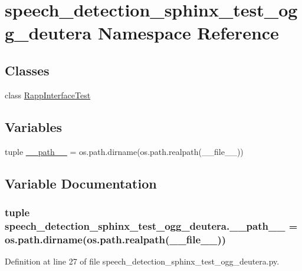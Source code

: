 \hypertarget{namespacespeech__detection__sphinx__test__ogg__deutera}{\section{speech\-\_\-detection\-\_\-sphinx\-\_\-test\-\_\-ogg\-\_\-deutera Namespace Reference}
\label{namespacespeech__detection__sphinx__test__ogg__deutera}
}
\subsection*{Classes}
\begin{DoxyCompactItemize}
\item 
class \hyperlink{classspeech__detection__sphinx__test__ogg__deutera_1_1RappInterfaceTest}{Rapp\-Interface\-Test}
\end{DoxyCompactItemize}
\subsection*{Variables}
\begin{DoxyCompactItemize}
\item 
tuple \hyperlink{namespacespeech__detection__sphinx__test__ogg__deutera_a96804d0ef596f194279efe03145b9c4f}{\-\_\-\-\_\-path\-\_\-\-\_\-} = os.\-path.\-dirname(os.\-path.\-realpath(\-\_\-\-\_\-file\-\_\-\-\_\-))
\end{DoxyCompactItemize}


\subsection{Variable Documentation}
\hypertarget{namespacespeech__detection__sphinx__test__ogg__deutera_a96804d0ef596f194279efe03145b9c4f}{
\subsubsection[{\-\_\-\-\_\-path\-\_\-\-\_\-}]{\setlength{\rightskip}{0pt plus 5cm}tuple speech\-\_\-detection\-\_\-sphinx\-\_\-test\-\_\-ogg\-\_\-deutera.\-\_\-\-\_\-path\-\_\-\-\_\- = os.\-path.\-dirname(os.\-path.\-realpath(\-\_\-\-\_\-file\-\_\-\-\_\-))}}\label{namespacespeech__detection__sphinx__test__ogg__deutera_a96804d0ef596f194279efe03145b9c4f}


Definition at line 27 of file speech\-\_\-detection\-\_\-sphinx\-\_\-test\-\_\-ogg\-\_\-deutera.\-py.

